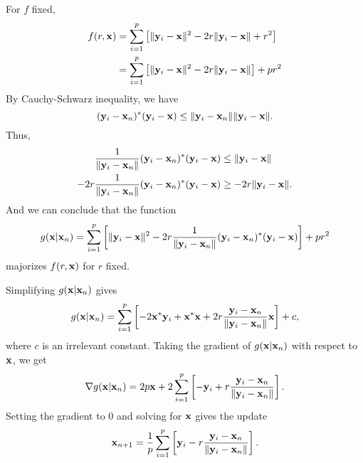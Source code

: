\documentclass{scrartcl}
\begin{document}
For $f$ fixed, 
\begin{equation}
	\begin{split}
	f(r, \mathbf{x})
	&  = \sum_{i=1}^p
	\left[ \|\mathbf{y}_i-\mathbf{x}\|^2 - 2r \|\mathbf{y}_i-\mathbf{x}\| + r^2 \right] \\
	& = \sum_{i=1}^p
	\left[ \|\mathbf{y}_i-\mathbf{x}\|^2 - 2r \|\mathbf{y}_i-\mathbf{x}\| \right] + pr^2
	\end{split}
\end{equation}
By Cauchy-Schwarz inequality, we have
\begin{equation}
	(\mathbf{y}_i-\mathbf{x}_n)^*(\mathbf{y}_i-\mathbf{x})
	\le \|\mathbf{y}_i-\mathbf{x}_n\| \|\mathbf{y}_i-\mathbf{x}\|.
\end{equation}
Thus,
\begin{equation}
	\begin{split}
	{1 \over \|\mathbf{y}_i-\mathbf{x}_n \|}(\mathbf{y}_i-\mathbf{x}_n)^*(\mathbf{y}_i-\mathbf{x})
	& \le \|\mathbf{y}_i-\mathbf{x}\| \\
	-2r {1 \over \|\mathbf{y}_i-\mathbf{x}_n \|}(\mathbf{y}_i-\mathbf{x}_n)^*(\mathbf{y}_i-\mathbf{x})
	& \ge -2r \|\mathbf{y}_i-\mathbf{x}\| .
	\end{split}
\end{equation}
And we can conclude that the function
\begin{equation}
	g(\mathbf{x} | \mathbf{x}_n)
	= \sum_{i=1}^p \left[ \|\mathbf{y}_i-\mathbf{x}\|^2 
	- 2r {1 \over \|\mathbf{y}_i-\mathbf{x}_n \|}(\mathbf{y}_i-\mathbf{x}_n)^*(\mathbf{y}_i-\mathbf{x}) \right]
	+ pr^2
\end{equation}
majorizes $f(r,\mathbf{x})$ for $r$ fixed.

Simplifying $g(\mathbf{x} | \mathbf{x}_n)$ gives
\begin{equation}
	g(\mathbf{x} | \mathbf{x}_n)
	= \sum_{i=1}^p
	\left[ -2 \mathbf{x}^*\mathbf{y}_i + \mathbf{x}^*\mathbf{x}
	+ 2r { {\mathbf{y}_i-\mathbf{x}_n} \over {\|\mathbf{y}_i - \mathbf{x}_n \|} } \mathbf{x} \right]
	+ c,
\end{equation}
where $c$ is an irrelevant constant.
Taking the gradient of $g(\mathbf{x} | \mathbf{x}_n)$ with respect to $\mathbf{x}$, we get
\begin{equation}
	\nabla g(\mathbf{x} | \mathbf{x}_n)
	= 2p\mathbf{x} + 2 \sum_{i=1}^p
	\left[
	    -\mathbf{y}_i + r { {\mathbf{y}_i-\mathbf{x}_n} \over {\|\mathbf{y}_i - \mathbf{x}_n \|} }
	\right].
\end{equation}
Setting the gradient to 0 and solving for $\mathbf{x}$ gives the update
\begin{equation}
	\mathbf{x}_{n+1} = {1 \over p}
	\sum_{i=1}^p
	\left[
		\mathbf{y}_i - r { {\mathbf{y}_i-\mathbf{x}_n} \over {\|\mathbf{y}_i - \mathbf{x}_n \|} }
	\right].
\end{equation}
\end{document}

